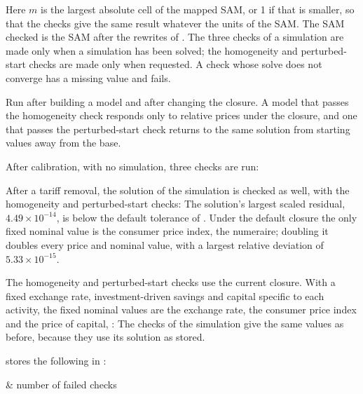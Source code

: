 Here $m$ is the largest absolute cell of the mapped SAM, or 1 if that is
smaller, so that the checks give the same result whatever the units of the
SAM. The SAM checked is the SAM after the rewrites of . The
three checks of a simulation are made only when a simulation has been solved;
the homogeneity and perturbed-start checks are made only when requested. A
check whose solve does not converge has a missing value and fails.

Run  after building a model and after changing the closure. A
model that passes the homogeneity check responds only to relative prices under
the closure, and one that passes the perturbed-start check returns to the same
solution from starting values away from the base.


After calibration, with no simulation, three checks are run:


After a tariff removal, the solution of the simulation is checked as well,
with the homogeneity and perturbed-start checks:
The solution's largest scaled residual, $4.49 \times 10^{-14}$, is below the
default tolerance of . Under the default closure the only
fixed nominal value is the consumer price index, the numeraire; doubling it
doubles every price and nominal value, with a largest relative deviation of
$5.33 \times 10^{-15}$.


The homogeneity and perturbed-start checks use the current closure. With a
fixed exchange rate, investment-driven savings and capital specific to each
activity, the fixed nominal values are the exchange rate, the consumer price
index and the price of capital, :
The checks of the simulation  give the same values as before,
because they use its solution as stored.


 stores the following in :
\begin{storedres}
 & number of failed checks\\
\end{storedres}


